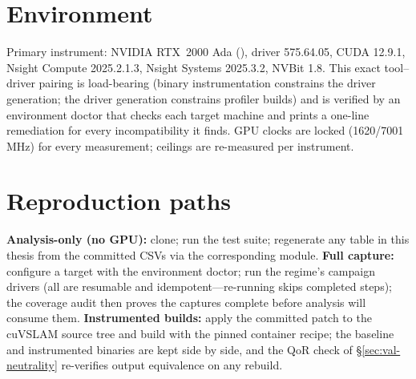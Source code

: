 \section{Environment}

Primary instrument: NVIDIA RTX~2000 Ada (), driver 575.64.05,
CUDA 12.9.1, Nsight Compute 2025.2.1.3, Nsight Systems 2025.3.2, NVBit 1.8.
This exact tool--driver pairing is load-bearing (binary instrumentation
constrains the driver generation; the driver generation constrains profiler
builds) and is verified by an environment doctor that checks each target
machine and prints a one-line remediation for every incompatibility it
finds. GPU clocks are locked (1620/7001\,MHz) for every measurement;
ceilings are re-measured per instrument.

\section{Reproduction paths}

\textbf{Analysis-only (no GPU):} clone; run the test suite; regenerate any
table in this thesis from the committed CSVs via the corresponding
 module. \textbf{Full capture:} configure a target with the
environment doctor; run the regime's campaign drivers (all are resumable
and idempotent---re-running skips completed steps); the coverage audit
then proves the captures complete before analysis will consume them.
\textbf{Instrumented builds:} apply the committed patch to the cuVSLAM
source tree and build with the pinned container recipe; the baseline and
instrumented binaries are kept side by side, and the QoR check of
\S\ref{sec:val-neutrality} re-verifies output equivalence on any rebuild.
